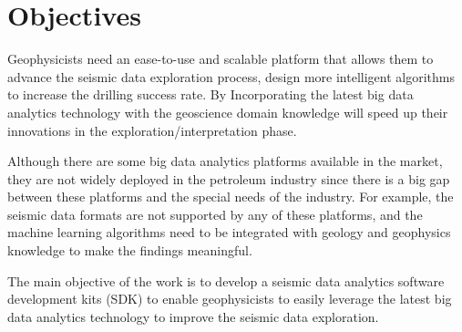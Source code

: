 \section{Objectives}

Geophysicists need an ease-to-use and scalable platform that allows them to advance the seismic data exploration process, design more intelligent algorithms to increase the drilling success rate. By Incorporating the latest big data analytics technology with the geoscience domain knowledge will speed up their innovations in the exploration/interpretation phase.

Although there are some big data analytics platforms available in the market, they are not widely deployed in the petroleum industry since there is a big gap between these platforms and the special needs of the industry. For example, the seismic data formats are not supported by any of these platforms, and the machine learning algorithms need to be integrated with geology and geophysics knowledge to make the findings meaningful.

The main objective of the work is to develop a seismic data analytics software development kits (SDK) to enable geophysicists to easily leverage the latest big data analytics technology to improve the seismic data exploration.




